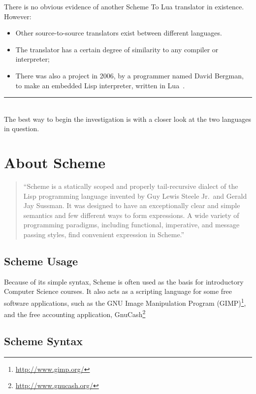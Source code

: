 There is no obvious evidence of another Scheme To Lua translator in existence.
However:
\begin{itemize}
\item Other source-to-source translators exist between different languages.
\item The translator has a certain degree of similarity to any compiler or
interpreter;
\item There was also a project in 2006, by a programmer named David
Bergman, to make an embedded Lisp interpreter, written in Lua~\cite{lualisp}.
\\[5mm]
\end{itemize}

\hrule \hfill \\[5mm]

\noindent The best way to begin the investigation is with a closer look at the
two languages in question.

\section{About Scheme}

\begin{quotation}
``Scheme is a statically scoped and properly tail-recursive
dialect of the Lisp programming language invented by Guy Lewis Steele Jr.\ and
Gerald Jay Sussman. It was designed to have an exceptionally clear and simple
semantics and few different ways to form expressions. A wide variety of
programming paradigms, including functional, imperative, and message passing
styles, find convenient expression in Scheme.''~\cite{r6rs}
\end{quotation}

\subsection{Scheme Usage}

Because of its simple syntax, Scheme is often used as the basis for introductory
Computer Science courses. It also acts as a scripting language for some free
software applications, such as the GNU Image Manipulation Program
(GIMP)\footnote{\url{http://www.gimp.org/}}, and the free accounting
application, GnuCash\footnote{\url{http://www.gnucash.org/}}

\subsection{Scheme Syntax}

